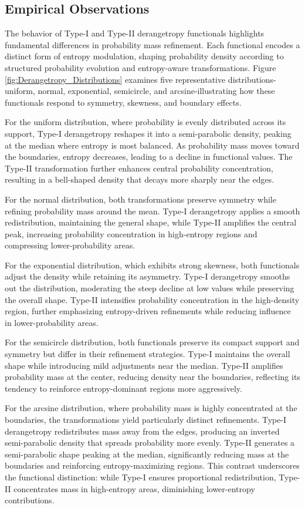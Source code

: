 \documentclass[sn-mathphys-num]{sn-jnl}%
\theoremstyle{thmstyleone}%
\theoremstyle{thmstyletwo}%
\theoremstyle{thmstylethree}%
\begin{document}
\subsection{Empirical Observations}
The behavior of Type-I and Type-II derangetropy functionals highlights fundamental differences in probability mass refinement. Each functional encodes a distinct form of entropy modulation, shaping probability density according to structured probability evolution and entropy-aware transformations. Figure \ref{fig:Derangetropy_Distributions} examines five representative distributions-uniform, normal, exponential, semicircle, and arcsine-illustrating how these functionals respond to symmetry, skewness, and boundary effects.

For the uniform distribution, where probability is evenly distributed across its support, Type-I derangetropy reshapes it into a semi-parabolic density, peaking at the median where entropy is most balanced. As probability mass moves toward the boundaries, entropy decreases, leading to a decline in functional values. The Type-II transformation further enhances central probability concentration, resulting in a bell-shaped density that decays more sharply near the edges.

For the normal distribution, both transformations preserve symmetry while refining probability mass around the mean. Type-I derangetropy applies a smooth redistribution, maintaining the general shape, while Type-II amplifies the central peak, increasing probability concentration in high-entropy regions and compressing lower-probability areas.

For the exponential distribution, which exhibits strong skewness, both functionals adjust the density while retaining its asymmetry. Type-I derangetropy smooths out the distribution, moderating the steep decline at low values while preserving the overall shape. Type-II intensifies probability concentration in the high-density region, further emphasizing entropy-driven refinements while reducing influence in lower-probability areas.

For the semicircle distribution, both functionals preserve its compact support and symmetry but differ in their refinement strategies. Type-I maintains the overall shape while introducing mild adjustments near the median. Type-II amplifies probability mass at the center, reducing density near the boundaries, reflecting its tendency to reinforce entropy-dominant regions more aggressively.

For the arcsine distribution, where probability mass is highly concentrated at the boundaries, the transformations yield particularly distinct refinements. Type-I derangetropy redistributes mass away from the edges, producing an inverted semi-parabolic density that spreads probability more evenly. Type-II generates a semi-parabolic shape peaking at the median, significantly reducing mass at the boundaries and reinforcing entropy-maximizing regions. This contrast underscores the functional distinction: while Type-I ensures proportional redistribution, Type-II concentrates mass in high-entropy areas, diminishing lower-entropy contributions.
\end{document}
